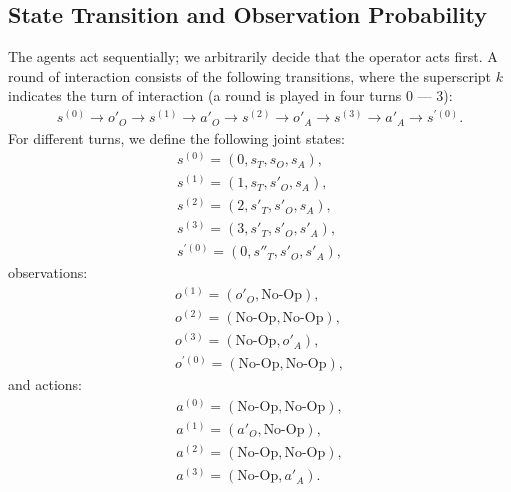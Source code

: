 \documentclass[12pt,a4paper]{article}
\begin{document}
\subsection{State Transition and Observation Probability}
The agents act sequentially; we arbitrarily decide that the operator acts first.
A round of interaction consists of the following transitions, where the superscript $k$ indicates the turn of interaction (a round is played in four turns $0$ --- $3$):
\begin{align}
s^{(0)} \rightarrow o'_O \rightarrow s^{(1)} \rightarrow a'_O \rightarrow s^{(2)} \rightarrow o'_A \rightarrow s^{(3)} \rightarrow a'_A \rightarrow s^{'(0)}.
\end{align}
\noindent For different turns, we define the following joint states:
\begin{align}
s^{(0)} = (0, s_T, s_O, s_A), \\
s^{(1)} = (1, s_T, s'_O, s_A), \\
s^{(2)} = (2, s'_T, s'_O, s_A), \\
s^{(3)} = (3, s'_T, s'_O, s'_A), \\
s^{'(0)} = (0, s''_T, s'_O, s'_A), 
\end{align}
observations:
\begin{align}
o^{(1)} = (o'_O, \text{No-Op}),\\
o^{(2)} = (\text{No-Op}, \text{No-Op}),\\
o^{(3)} = (\text{No-Op}, o'_A),\\
o^{'(0)} = (\text{No-Op}, \text{No-Op}),
\end{align}
and actions:
\begin{align}
a^{(0)} = (\text{No-Op}, \text{No-Op}),\\
a^{(1)} = (a'_O, \text{No-Op}),\\
a^{(2)} = (\text{No-Op}, \text{No-Op}),\\
a^{(3)} =  (\text{No-Op}, a'_A).
\end{align}
\end{document}
